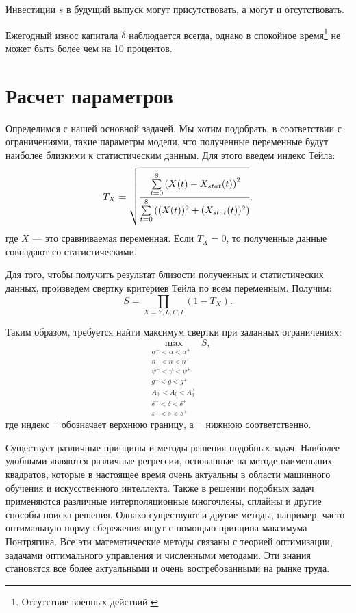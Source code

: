 Инвестиции $s$ в будущий выпуск могут присутствовать, а могут и отсутствовать.

Ежегодный износ капитала $\delta$ наблюдается всегда, однако в спокойное время\footnote{Отсутствие военных действий.} не может быть более чем на 10 процентов.

\section{Расчет параметров}

Определимся с нашей основной задачей.
Мы хотим подобрать, в соответствии с ограничениями, такие параметры модели, что полученные переменные будут наиболее близкими к статистическим данным.
Для этого введем индекс Тейла:
\begin{equation*}
	T_{X} = \sqrt{\cfrac{\sum\limits_{t = 0}^{8}\left(X(t) - X_{stat}(t)\right)^2}{\sum\limits_{t = 0}^{8}\left((X(t))^2 + (X_{stat}(t))^2\right)}}\text{,}
\end{equation*}
где $X$ --- это сравниваемая переменная.
Если $T_{X} = 0$, то полученные данные совпадают со статистическими.

Для того, чтобы получить результат близости полученных и статистических данных, произведем свертку критериев Тейла по всем переменным.
Получим:
\begin{equation*}
S=\prod\limits_{X=Y,L,C,I}\left(1 -T_{X}\right)\text{.}
\end{equation*}

Таким образом, требуется найти максимум свертки при заданных ограничениях:
\begin{equation*}
\max_{\substack{\alpha^- < \alpha < \alpha^+ \\ n^- < n < n^+ \\ \psi^- < \psi < \psi^+ \\ g^- < g < g^+ \\ A_0^- < A_0 < A_0^+ \\ \delta^- < \delta < \delta^+\\ s^- < s < s^+}} S \text{,}
\end{equation*}
где индекс $^+$ обозначает верхнюю границу, а $^-$ нижнюю соответственно.

Существует различные принципы и методы решения подобных задач.
Наиболее удобными являются различные регрессии, основанные на методе наименьших квадратов, которые в настоящее время очень актуальны в области машинного обучения и искусственного интеллекта.
Также в решении подобных задач применяются различные интерполяционные многочлены, сплайны и другие способы поиска решения.
Однако существуют и другие методы, например, часто оптимальную норму сбережения ищут с помощью принципа максимума Понтрягина.
Все эти математические методы связаны с теорией оптимизации, задачами оптимального управления и численными методами.
Эти знания становятся все более актуальными и очень востребованными на рынке труда.

